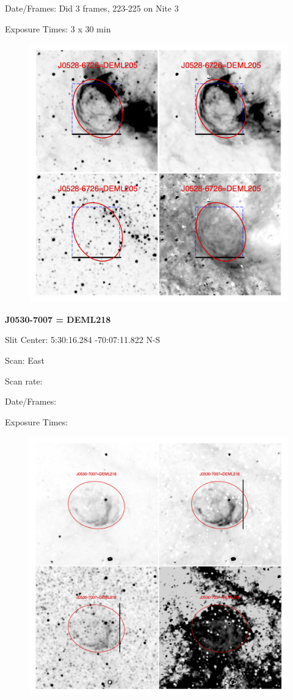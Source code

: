 \documentclass[11pt]{article}
\begin{document}

Date/Frames:   Did 3 frames, 223-225 on Nite 3

Exposure Times:   3 x 30 min

\begin{figure}
\includegraphics[width=12.5cm]{snapshots/DEML205.png}
\end{figure}

\newpage
{\bf J0530-7007 = DEML218}  
 
Slit Center:   5:30:16.284   -70:07:11.822 N-S

Scan:  East

Scan rate:  

Date/Frames:

Exposure Times:  

\begin{figure}
\includegraphics[width=11.cm]{snapshots/J0530-7007.png}
\end{figure}
\end{document}
